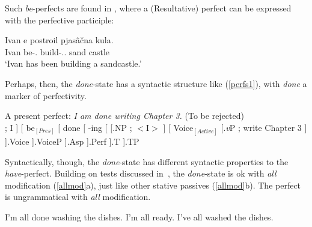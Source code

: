 \documentclass[output=paper,modfonts,nonflat]{langsci/langscibook}
\begin{document}
Such \emph{be}-perfects are found in , where a (Resultative)
perfect can be expressed with the perfective participle:

\begin{exe}
    \ex {}
    \sn
    \gll  Ivan e postroil pjas\^{a}\v{c}na kula. \\
    Ivan be-\Tsg.\Prs{} build-\Prf.\M.\Sg{} sand castle \\
    \trans `Ivan has been building a sandcastle.' \hfill{\citep[296]{Pancheva2003a}}
\end{exe}

Perhaps, then, the \emph{done}-state has a syntactic structure like
(\ref{perfs1}), with \emph{done} a marker of perfectivity.

\begin{exe}
\ex A present perfect: {\em I am done writing Chapter 3.} (To be
rejected)\label{perfs1}\\
\vspace{12pt}
    \Tree
        [
            [.NP \edge[roof]; {I} ]
            [
                be$_{[Pres]}$
                [
                    done
                    [
                        -ing
                        [
                            [.NP \edge[roof]; {$<$I$>$} ]
                            [
                                Voice$_{[Active]}$
                                [.\emph{v}P \edge[roof]; {write Chapter 3} ]
                            ].Voice
                        ].VoiceP
                    ].Asp
                ].Perf
            ].T
        ].TP
\end{exe}

Syntactically, though, the \emph{done}-state has different syntactic properties
to the  \emph{have}-perfect. Building on tests discussed
in~\cite{Fruehwald2015a}, the \emph{done}-state is ok with {\em all}
modification (\ref{allmod}a), just like other stative passives (\ref{allmod}b).
The perfect is ungrammatical with {\em all} modification.

\begin{exe}
\ex\label{allmod}
\begin{xlist}
\ex I'm all done washing the dishes.
\ex I'm all ready.
\ex *I've all washed the dishes.
\end{xlist}
\end{exe}
\end{document}
